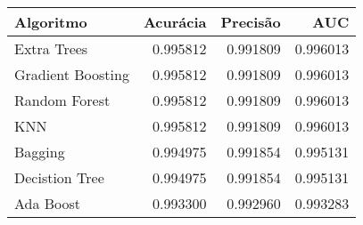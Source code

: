 \begin{tabular}{lrrr}
\toprule
        Algoritmo &  Acurácia &  Precisão &      AUC \\
\midrule
      Extra Trees &  0.995812 &  0.991809 & 0.996013 \\
Gradient Boosting &  0.995812 &  0.991809 & 0.996013 \\
    Random Forest &  0.995812 &  0.991809 & 0.996013 \\
              KNN &  0.995812 &  0.991809 & 0.996013 \\
          Bagging &  0.994975 &  0.991854 & 0.995131 \\
   Decistion Tree &  0.994975 &  0.991854 & 0.995131 \\
        Ada Boost &  0.993300 &  0.992960 & 0.993283 \\
\bottomrule
\end{tabular}
